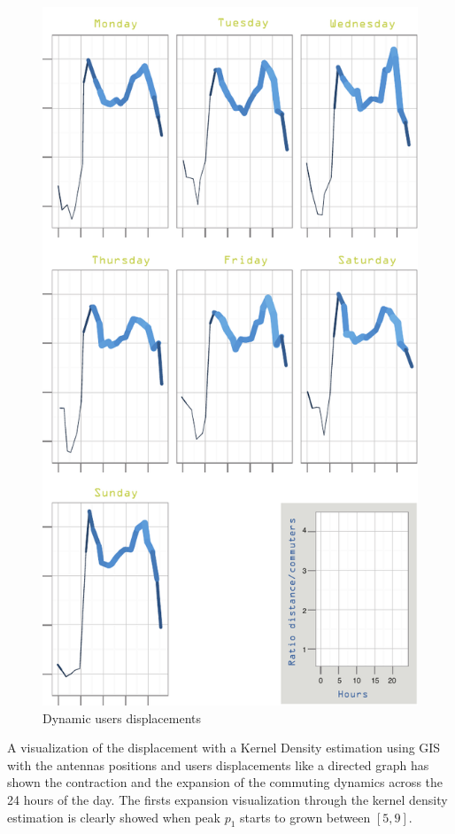 \begin{figure}[h]
\begin{center}
\includegraphics[scale = 0.8] {results/images/commuting_results.pdf}
\caption{Dynamic users displacements}
\label{fig:dynamic_displacements}
\end{center}
\end{figure}

A visualization of the displacement with a Kernel Density estimation using GIS with the antennas positions and users displacements like a directed graph has shown the contraction and the expansion of the commuting dynamics across the 24 hours of the day. The firsts expansion visualization through the kernel density estimation is clearly showed when peak $p_1$ starts to grown between $[5,9]$.

